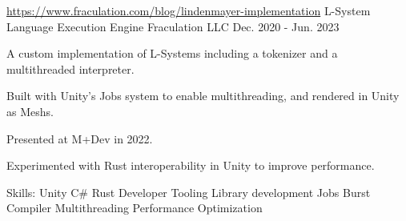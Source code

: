 \begin{cventries}
  \cventry
   {\href{https://www.fraculation.com/blog/lindenmayer-implementation}{https://www.fraculation.com/blog/lindenmayer-implementation}} %
    {L-System Language Execution Engine} %
    {Fraculation LLC} %
    {Dec. 2020 - Jun. 2023} %
    {
      \begin{cvitems} %
        \item {A custom implementation of L-Systems including a tokenizer and a multithreaded interpreter.}
        \item {Built with Unity's Jobs system to enable multithreading, and rendered in Unity as Meshs.}
        \item {Presented at M+Dev in 2022.}
        \item {Experimented with Rust interoperability in Unity to improve performance.}
        \item {Skills: Unity \textbullet{} C\# \textbullet{} Rust \textbullet{} Developer Tooling \textbullet{} Library development  \textbullet{} Jobs \textbullet{} Burst Compiler \textbullet{} Multithreading \textbullet{} Performance Optimization}
      \end{cvitems}
    }

\end{cventries}
    